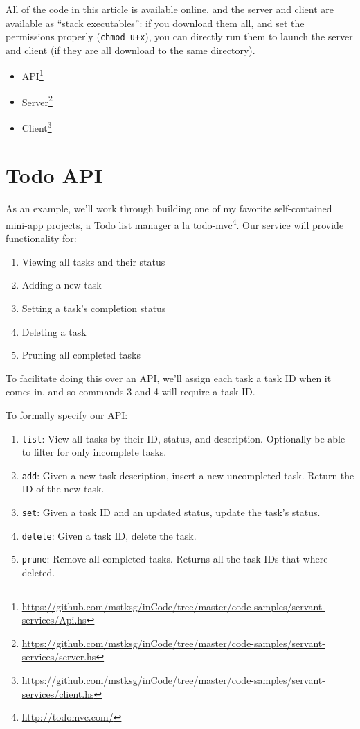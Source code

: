 \documentclass[]{article}
\renewcommand{\href}[2]{#2\footnote{\url{#1}}}
\begin{document}
All of the code in this article is available online, and the server and client
are available as ``stack executables'': if you download them all, and set the
permissions properly (\texttt{chmod\ u+x}), you can directly run them to launch
the server and client (if they are all download to the same directory).

\begin{itemize}
\tightlist
\item
  \href{https://github.com/mstksg/inCode/tree/master/code-samples/servant-services/Api.hs}{API}
\item
  \href{https://github.com/mstksg/inCode/tree/master/code-samples/servant-services/server.hs}{Server}
\item
  \href{https://github.com/mstksg/inCode/tree/master/code-samples/servant-services/client.hs}{Client}
\end{itemize}

\section{Todo API}\label{todo-api}

As an example, we'll work through building one of my favorite self-contained
mini-app projects, a \href{http://todomvc.com/}{Todo list manager a la
todo-mvc}. Our service will provide functionality for:

\begin{enumerate}
\def\labelenumi{\arabic{enumi}.}
\tightlist
\item
  Viewing all tasks and their status
\item
  Adding a new task
\item
  Setting a task's completion status
\item
  Deleting a task
\item
  Pruning all completed tasks
\end{enumerate}

To facilitate doing this over an API, we'll assign each task a task ID when it
comes in, and so commands 3 and 4 will require a task ID.

To formally specify our API:

\begin{enumerate}
\def\labelenumi{\arabic{enumi}.}
\tightlist
\item
  \texttt{list}: View all tasks by their ID, status, and description. Optionally
  be able to filter for only incomplete tasks.
\item
  \texttt{add}: Given a new task description, insert a new uncompleted task.
  Return the ID of the new task.
\item
  \texttt{set}: Given a task ID and an updated status, update the task's status.
\item
  \texttt{delete}: Given a task ID, delete the task.
\item
  \texttt{prune}: Remove all completed tasks. Returns all the task IDs that
  where deleted.
\end{enumerate}
\end{document}
